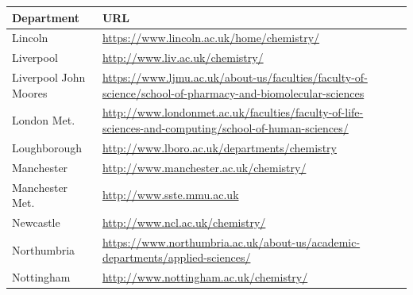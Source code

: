  \begin{table}[H]
 \begin{tabular}{||p{4cm}|Y||}
\hline
 Department                         & URL \\
\hline
 \footnotesize{Lincoln                        }    & \footnotesize{\url{https://www.lincoln.ac.uk/home/chemistry/}}                                                                                            \\
 \footnotesize{Liverpool                     }     & \footnotesize{\url{http://www.liv.ac.uk/chemistry/}}                                                                                                      \\
 \footnotesize{Liverpool John Moores        }      & \footnotesize{\url{https://www.ljmu.ac.uk/about-us/faculties/faculty-of-science/school-of-pharmacy-and-biomolecular-sciences}}                            \\
 \footnotesize{London Met.         }       & \footnotesize{\url{http://www.londonmet.ac.uk/faculties/faculty-of-life-sciences-and-computing/school-of-human-sciences/}}                                \\
 \footnotesize{Loughborough               }        & \footnotesize{\url{http://www.lboro.ac.uk/departments/chemistry}}                                                                                         \\
 \footnotesize{Manchester                }         & \footnotesize{\url{http://www.manchester.ac.uk/chemistry/}}                                                                                               \\
 \footnotesize{Manchester Met.  }          & \footnotesize{\url{http://www.sste.mmu.ac.uk}}                                                                                                            \\
 \footnotesize{Newcastle  }                        & \footnotesize{\url{http://www.ncl.ac.uk/chemistry/}}                                                                                                      \\
 \footnotesize{Northumbria}                        & \footnotesize{\url{https://www.northumbria.ac.uk/about-us/academic-departments/applied-sciences/}}\\
 \footnotesize{Nottingham                  }       & \footnotesize{\url{http://www.nottingham.ac.uk/chemistry/}}                                                                                               \\

\end{tabular}
\end{table}
